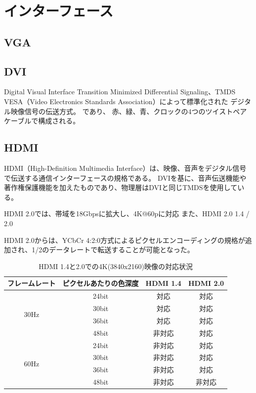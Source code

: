 \section{インターフェース}
\label{sec:interface}

\subsection{VGA}


\subsection{DVI}
Digital Visual Interface
Transition Minimized Differential Signaling、TMDS
VESA（Video Electronics Standards Association）によって標準化された デジタル映像信号の伝送方式。
であり、
赤、緑、青、クロックの4つのツイストペアケーブルで構成される。

\subsection{HDMI}
HDMI（High-Definition Multimedia Interface）は、映像、音声をデジタル信号で伝送する通信インターフェースの規格である。
DVIを基に、音声伝送機能や著作権保護機能を加えたものであり、物理層はDVIと同じTMDSを使用している。

HDMI 2.0では、帯域を18Gbpsに拡大し、4K@60pに対応
また、HDMI 2.0
1.4 / 2.0

HDMI 2.0からは、YCbCr 4:2:0方式によるピクセルエンコーディングの規格が追加され、1/2のデータレートで転送することが可能となった。

\begin{table}[htbp]
  \caption{HDMI 1.4と2.0での4K(3840x2160)映像の対応状況}
  \label{tb:video-bandwidth}
  \begin{center}
  \begin{tabular}{c|c|c|c}
    \hline
      フレームレート & ピクセルあたりの色深度 & HDMI 1.4 & HDMI 2.0\\\hline\hline
    \multirow{4}{*}{30Hz} &
        24bit & 対応   & 対応 \\\cline{2-4}
      & 30bit & 対応   & 対応 \\\cline{2-4}
      & 36bit & 対応   & 対応 \\\cline{2-4}
      & 48bit & 非対応 & 対応 \\\hline
    \multirow{4}{*}{60Hz} &
        24bit & 非対応 & 対応  \\\cline{2-4}
      & 30bit & 非対応 & 対応  \\\cline{2-4}
      & 36bit & 非対応 & 対応  \\\cline{2-4}
      & 48bit & 非対応 & 非対応 \\\hline
  \end{tabular}\end{center}
\end{table}

